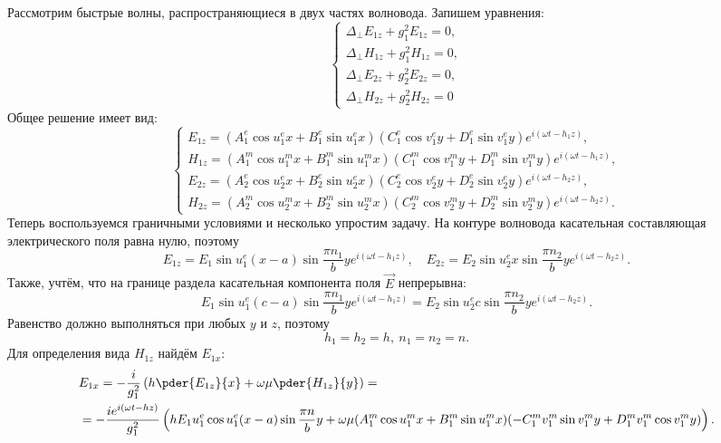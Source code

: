 \documentclass[a4paper]{hedsemwork}
\renewcommand{\frac}{\dfrac}
\begin{document}
    Рассмотрим быстрые волны, распространяющиеся в двух частях волновода.
    Запишем уравнения:
    \[
        \left\{
        \begin{array}{l}
            \Delta_\perp E_{1z} + g_1^2 E_{1z} = 0,\\
            \Delta_\perp H_{1z} + g_1^2 H_{1z} = 0,\\
            \Delta_\perp E_{2z} + g_2^2 E_{2z} = 0,\\
            \Delta_\perp H_{2z} + g_2^2 H_{2z} = 0
        \end{array}
        \right.
    \]
    Общее решение имеет вид:
    \[
        \left\{
        \begin{array}{l}
            E_{1z} =
            (A^e_1\cos u^e_1 x + B^e_1\sin u^e_1 x)
            (C^e_1\cos v^e_1 y + D^e_1\sin v^e_1 y)
            e^{i(\omega t - h_1 z)}, \\
            H_{1z} =
            (A^m_1\cos u^m_1 x + B^m_1\sin u^m_1 x)
            (C^m_1\cos v^m_1 y + D^m_1\sin v^m_1 y)
            e^{i(\omega t - h_1 z)}, \\
            E_{2z} =
            (A^e_2\cos u^e_2 x + B^e_2\sin u^e_2 x)
            (C^e_2\cos v^e_2 y + D^e_2\sin v^e_2 y)
            e^{i(\omega t - h_2 z)}, \\
            H_{2z} =
            (A^m_2\cos u^m_2 x + B^m_2\sin u^m_2 x)
            (C^m_2\cos v^m_2 y + D^m_2\sin v^m_2 y)
            e^{i(\omega t - h_2 z)}.
        \end{array}
        \right.
    \]
Теперь воспользуемся граничными условиями и несколько упростим задачу.
На контуре волновода касательная составляющая электрического поля равна нулю,
поэтому
    \[
        E_{1z} = E_1\sin u^e_1 (x-a) \sin \frac{\pi n_1}{b}y
        e^{i(\omega t - h_1 z)},\quad
        E_{2z} = E_2\sin u^e_2 x \sin \frac{\pi n_2}{b}y
        e^{i(\omega t - h_2 z)}.
    \]
Также, учтём, что на границе раздела касательная компонента поля \( \vec{E} \)
непрерывна:
    \[
        E_1\sin u^e_1 (c-a) \sin \frac{\pi n_1}{b}y
        e^{i(\omega t - h_1 z)} =
        E_2\sin u^e_2 c \sin \frac{\pi n_2}{b}y
        e^{i(\omega t - h_2 z)}.
    \]
Равенство должно выполняться при любых \( y \) и \( z \), поэтому
\[
    \boxed{h_1 = h_2 = h,\ n_1 = n_2 = n.}
\]
Для определения вида \( H_{1z} \) найдём \( E_{1x} \):
\begin{align*}
    & E_{1x} =
    -\frac{i}{g_1^2}\left( h\pder{E_{1z}}{x} + \omega\mu\pder{H_{1z}}{y} \right)
    =\\
    & = -\frac{ie^{i(\omega t - h z)}}{g_1^2}
    \left( h E_1 u^e_1 \cos u^e_1(x-a)\sin\frac{\pi n}{b}y +
    \omega\mu(A^m_1\cos u^m_1 x + B^m_1\sin u^m_1 x)
    (-C^m_1 v^m_1 \sin v^m_1 y + D^m_1 v^m_1 \cos v^m_1 y)\right).
\end{align*}
\end{document}
